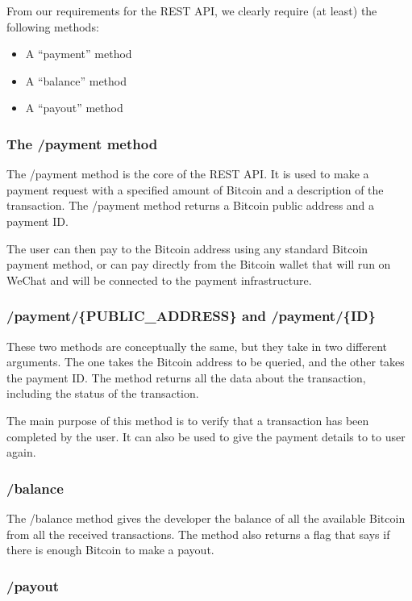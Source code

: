 From our requirements for the REST API, we clearly require (at least) the following methods:

\begin{itemize}
	\item A ``payment'' method
	\item A ``balance'' method
	\item A ``payout'' method
\end{itemize}

\subsubsection{The /payment method}
\label{sct:payment}

The /payment method is the core of the REST API. It is used to make a payment request with a specified amount of Bitcoin and a description of the transaction. The /payment method returns a Bitcoin public address and a payment ID. 

The user can then pay to the Bitcoin address using any standard Bitcoin payment method, or can pay directly from the Bitcoin wallet that will run on WeChat and will be connected to the payment infrastructure.

\subsubsection{/payment/\{PUBLIC\_ADDRESS\} and /payment/\{ID\}}

These two methods are conceptually the same, but they take in two different arguments. The one takes the Bitcoin address to be queried, and the other takes the payment ID. The method returns all the data about the transaction, including the status of the transaction. 

The main purpose of this method is to verify that a transaction has been completed by the user. It can also be used to give the payment details to to user again.

\subsubsection{/balance}

The /balance method gives the developer the balance of all the available Bitcoin from all the received transactions. The method also returns a flag that says if there is enough Bitcoin to make a payout.

\subsubsection{/payout}

